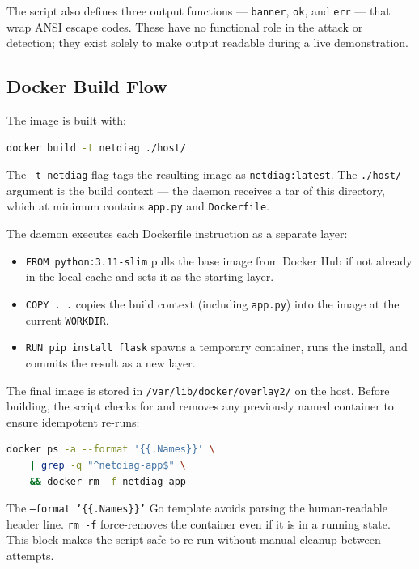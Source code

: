The script also defines three output functions --- \texttt{banner}, \texttt{ok}, and \texttt{err} --- that wrap ANSI escape codes. These have no functional role in the attack or detection; they exist solely to make output readable during a live demonstration.

\subsection{Docker Build Flow}

The image is built with:

\begin{lstlisting}[language=bash]
docker build -t netdiag ./host/
\end{lstlisting}

The \texttt{-t netdiag} flag tags the resulting image as \texttt{netdiag:latest}. The \texttt{./host/} argument is the build context --- the daemon receives a tar of this directory, which at minimum contains \texttt{app.py} and \texttt{Dockerfile}.

The daemon executes each Dockerfile instruction as a separate layer:

\begin{itemize}
    \item \texttt{FROM python:3.11-slim} pulls the base image from Docker Hub if not already in the local cache and sets it as the starting layer.
    \item \texttt{COPY . .} copies the build context (including \texttt{app.py}) into the image at the current \texttt{WORKDIR}.
    \item \texttt{RUN pip install flask} spawns a temporary container, runs the install, and commits the result as a new layer.
\end{itemize}

The final image is stored in \texttt{/var/lib/docker/overlay2/} on the host. Before building, the script checks for and removes any previously named container to ensure idempotent re-runs:

\begin{lstlisting}[language=bash]
docker ps -a --format '{{.Names}}' \
    | grep -q "^netdiag-app$" \
    && docker rm -f netdiag-app
\end{lstlisting}

The \texttt{--format '\{\{.Names\}\}'} Go template avoids parsing the human-readable header line. \texttt{rm -f} force-removes the container even if it is in a running state. This block makes the script safe to re-run without manual cleanup between attempts.

